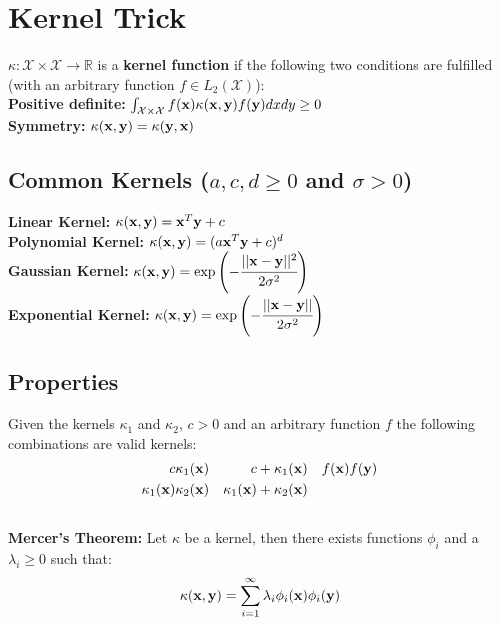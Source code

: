 \section{Kernel Trick}
\begin{mdframed}[style=eqbox]
$\kappa: \mathcal X \times \mathcal X \rightarrow \mathbb R$ is a \textbf{kernel function} if the following two conditions are fulfilled (with an arbitrary function $f \in L_2(\mathcal X)$):\\
\textbf{Positive definite:} $\int_{ \mathcal X \times \mathcal X} f(\mathbf{x}) \kappa(\mathbf{x}, \mathbf{y}) f( \mathbf{y}) dx dy \geq 0$\\
\textbf{Symmetry:}  $ \kappa(\mathbf{x}, \mathbf{y}) = \kappa(\mathbf{y}, \mathbf{x})$
\end{mdframed}
%
\begin{mdframed}[style=eqbox]
\subsection{Common Kernels (\(a, c, d \geq 0\) and \(\sigma > 0\))}
\textbf{Linear Kernel:} \(\kappa(\mathbf{x}, \mathbf{y}) = \mathbf{x}^T \mathbf{y} + c\)\\
\textbf{Polynomial Kernel:} \(\kappa(\mathbf{x}, \mathbf{y}) = (a \mathbf{x}^T \mathbf{y} + c)^d\)\\
\textbf{Gaussian Kernel:} \(\kappa(\mathbf{x}, \mathbf{y}) = \exp \left( -\cfrac{\vert\vert\mathbf{x} - \mathbf{y} \vert\vert^2}{2 \sigma^2} \right)\)\\
\textbf{Exponential Kernel:} \( \kappa(\mathbf{x}, \mathbf{y}) = \exp \left(- \cfrac{\vert\vert \mathbf{x} - \mathbf{y} \vert\vert}{2 \sigma^2} \right)\)
\end{mdframed}
%
\begin{mdframed}[style=eqbox]
\subsection{Properties}
Given the kernels $\kappa_1$ and $\kappa_2$, $c > 0$ and an arbitrary function $f$ the following combinations are valid kernels:
\vspace*{-8pt}\begin{align*}
  c \kappa_1(\mathbf{x}) && c + \kappa_1(\mathbf{x}) && f(\mathbf{x}) f(\mathbf{y})\\
  \kappa_1(\mathbf{x}) \kappa_2(\mathbf{x}) && \kappa_1(\mathbf{x}) + \kappa_2(\mathbf{x})
\end{align*}\vspace*{-16pt}\\
\textbf{Mercer's Theorem:}
Let $\kappa$ be a kernel, then there exists functions $\phi_i$ and a $\lambda_i \geq 0$ such that:
\vspace*{-8pt}\begin{align*}
\kappa(\mathbf{x}, \mathbf{y}) = \sum_{i=1}^{\infty} \lambda_i \phi_i(\mathbf{x}) \phi_i(\mathbf{y})
\end{align*}
\end{mdframed}